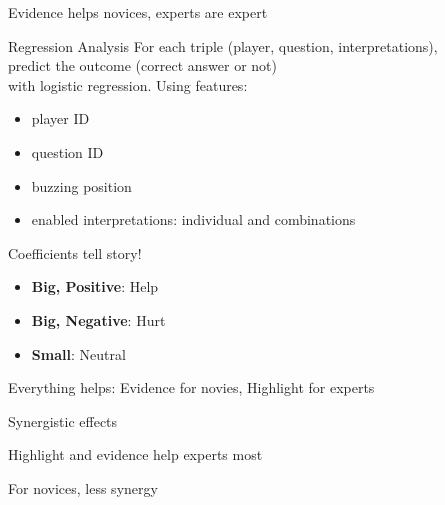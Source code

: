 \documentclass[compress]{beamer}
\newcommand{\fsi}[2]{
\begin{frame}[plain]
\vspace*{-1pt}
\makebox[\linewidth]{\texttt{[image: \#1]}}
\begin{center}
#2
\end{center}
\end{frame}
}
\begin{document}
\fsi{qb/augment/tools_acc}{Evidence helps novices, experts are expert}

\begin{frame}{Regression Analysis}
  For each triple (player, question, interpretations), \\
  predict the outcome (correct answer or not) \\
  with logistic regression. Using features:
    \begin{itemize}
        \item \alert<3>{player ID}
        \item \alert<3>{question ID}
        \item buzzing position
        \item enabled interpretations: individual and combinations
    \end{itemize}

    \pause

    \begin{block}{Coefficients tell story!}
      \begin{itemize}
        \item {\bf Big, Positive}: Help
        \item {\bf Big, Negative}: Hurt
        \item {\bf Small}: Neutral
      \end{itemize}
    \end{block}

\end{frame}


\fsi{qb/augment/coefs_0}{Everything helps: Evidence for novies,
  Highlight for experts}
\fsi{qb/augment/coefs_1}{Synergistic effects}
\fsi{qb/augment/coefs_2}{Highlight and evidence help experts most}
\fsi{qb/augment/coefs_3}{For novices, less synergy}
\end{document}
